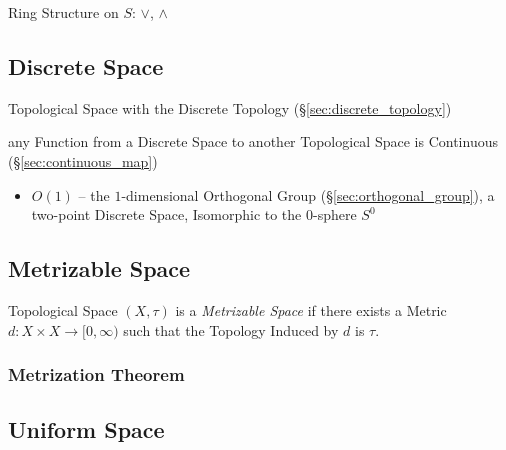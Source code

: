 Ring Structure on $S$: $\vee$, $\wedge$



\subsection{Discrete Space}\label{sec:discrete_space}

Topological Space with the Discrete Topology (\S\ref{sec:discrete_topology})

any Function from a Discrete Space to another Topological Space is Continuous
(\S\ref{sec:continuous_map})

\begin{itemize}
  \item $O(1)$ -- the $1$-dimensional Orthogonal Group
    (\S\ref{sec:orthogonal_group}), a two-point Discrete Space, Isomorphic to
    the $0$-sphere $S^0$
\end{itemize}



\subsection{Metrizable Space}\label{sec:metrizable_space}

Topological Space $(X, \tau)$ is a \emph{Metrizable Space} if there
exists a Metric $d : X \times X \rightarrow [0, \infty)$ such that the
  Topology Induced by $d$ is $\tau$.



\subsubsection{Metrization Theorem}\label{sec:metrization_theorem}



\subsection{Uniform Space}\label{sec:uniform_space}

